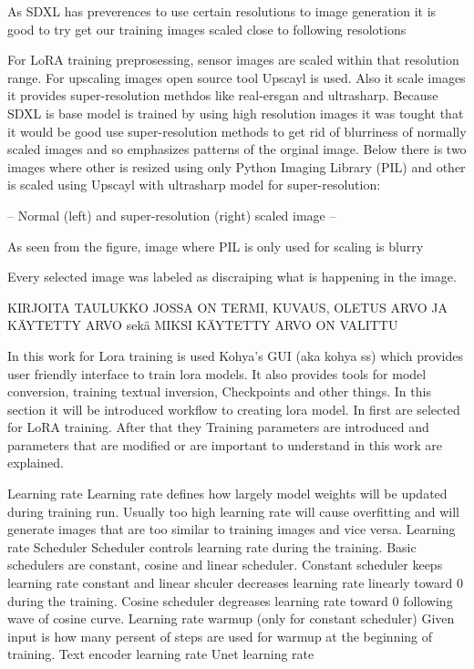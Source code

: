  


As SDXL has preverences to use certain resolutions to image generation it is good to try get our training images scaled close to following resolotions


For LoRA training preprosessing, sensor images are scaled within that resolution range. For upscaling images open source tool Upscayl is used. Also it scale images it provides super-resolution methdos like real-ersgan and ultrasharp. Because SDXL is base model is trained by using high resolution images it was tought that it would be good use super-resolution methods to get rid of blurriness of normally scaled images and so emphasizes patterns of the orginal image. Below there is two images where other is resized using only Python Imaging Library (PIL) and other is scaled using Upscayl with ultrasharp model for super-resolution:

-- Normal (left) and super-resolution (right) scaled image -- 

As seen from the figure, image where PIL is only used for scaling is blurry


Every selected image was labeled as discraiping what is happening in the image. 
 

KIRJOITA TAULUKKO JOSSA ON TERMI, KUVAUS, OLETUS ARVO JA KÄYTETTY ARVO sekä MIKSI KÄYTETTY ARVO ON VALITTU


In this work for Lora training is used Kohya's GUI (aka kohya ss) which provides user friendly interface to train lora models. 
It also provides tools for model conversion, training textual inversion, Checkpoints and other things. 
In this section it will be introduced workflow to creating lora model. In first are selected for LoRA training.
After that they 
Training parameters are introduced and parameters that are modified or are important to understand in this work are explained.

Learning rate
Learning rate defines how largely model weights will be updated during training run. Usually too high learning rate will cause overfitting and will generate images that are too similar to training images and vice versa.
Learning rate Scheduler
Scheduler controls learning rate during the training. Basic schedulers are constant, cosine and linear scheduler. Constant scheduler keeps learning rate constant and linear shculer decreases learning rate linearly toward 0 during the training. Cosine scheduler degreases learning rate toward 0 following wave of cosine curve. 
Learning rate warmup (only for constant scheduler)
Given input is how many persent of steps are used for warmup at the beginning of training.
Text encoder learning rate
Unet learning rate

